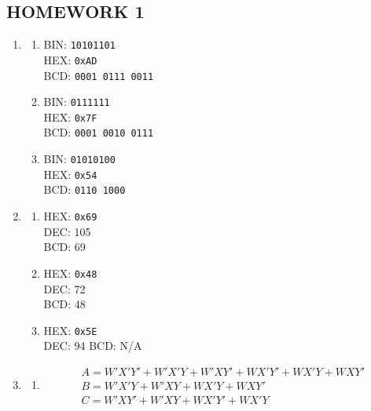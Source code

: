 \documentclass[10pt]{article}
\begin{document}

\begin{centering}
  \section*{HOMEWORK 1}
\end{centering}

\begin{enumerate}
  \item
  \begin{enumerate}
    \item 
      BIN: \texttt{10101101} \\
      HEX: \texttt{0xAD} \\
      BCD: \texttt{0001 0111 0011}
    \item 
      BIN: \texttt{0111111} \\
      HEX: \texttt{0x7F} \\
      BCD: \texttt{0001 0010 0111}
    \item 
      BIN: \texttt{01010100} \\
      HEX: \texttt{0x54} \\
      BCD: \texttt{0110 1000}
  \end{enumerate}
  \item 
  \begin{enumerate}
    \item 
      HEX: \texttt{0x69} \\
      DEC: 105 \\
      BCD: 69
    \item 
      HEX: \texttt{0x48} \\
      DEC: 72 \\
      BCD: 48
    \item 
      HEX: \texttt{0x5E} \\
      DEC: 94
      BCD: N/A
  \end{enumerate}
  \item 
  \begin{enumerate}
    \item 
      \begin{gather*}
        A=W'X'Y'+W'X'Y+W'XY'+WX'Y'+WX'Y+WXY' \\
        B=W'X'Y+W'XY+WX'Y+WXY' \\
        C=W'XY'+W'XY+WX'Y'+WX'Y
      \end{gather*}
      \begin{figure} [H]
      \begin{tabular}{c}

\end{tabular}
\end{figure}
\end{enumerate}
\end{enumerate}
\end{document}
